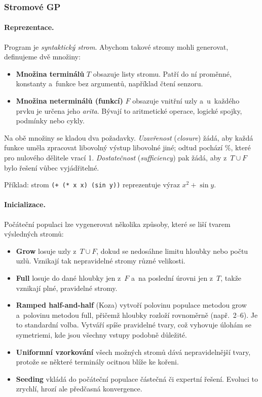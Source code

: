 \documentclass[11pt,a4paper]{article}
\theoremstyle{definition}
\begin{document}
\subsubsection{Stromové GP}

\paragraph{Reprezentace.} Program je \emph{syntaktický strom}. Abychom takové stromy
mohli generovat, definujeme dvě množiny:
\begin{itemize}
\item \textbf{Množina terminálů} $T$ obsazuje listy stromu. Patří do ní proměnné,
  konstanty a~funkce bez argumentů, například čtení senzoru.
\item \textbf{Množina neterminálů (funkcí)} $F$ obsazuje vnitřní uzly a~u~každého prvku
  je určena jeho \emph{arita}. Bývají to aritmetické operace, logické spojky, podmínky
  nebo cykly.
\end{itemize}
Na obě množiny se kladou dva požadavky. \emph{Uzavřenost} (\emph{closure}) žádá, aby
každá funkce uměla zpracovat libovolný výstup libovolné jiné; odtud pochází
 $\%$, které pro nulového dělitele vrací 1. \emph{Dostatečnost}
(\emph{sufficiency}) pak žádá, aby z~$T \cup F$ bylo řešení vůbec vyjádřitelné.

Příklad: strom \texttt{(+ (* x x) (sin y))} reprezentuje výraz $x^2 + \sin y$.

\paragraph{Inicializace.} Počáteční populaci lze vygenerovat několika způsoby, které se
liší tvarem výsledných stromů:
\begin{itemize}
\item \textbf{Grow} losuje uzly z~$T \cup F$, dokud se nedosáhne limitu hloubky nebo
  počtu uzlů. Vznikají tak nepravidelné stromy různé velikosti.
\item \textbf{Full} losuje do dané hloubky jen z~$F$ a~na poslední úrovni jen z~$T$,
  takže vznikají plné, pravidelné stromy.
\item \textbf{Ramped half-and-half} (Koza) vytvoří polovinu populace metodou grow
  a~polovinu metodou full, přičemž hloubky rozloží rovnoměrně (např.\ 2--6). Je to
  standardní volba. Vytváří spíše  pravidelné tvary, což vyhovuje úlohám se
  symetriemi, kde jsou všechny vstupy podobně důležité.
\item \textbf{Uniformní vzorkování} všech možných stromů dává nepravidelnější tvary,
  protože se některé terminály ocitnou blíže ke kořeni.
\item \textbf{Seeding} vkládá do počáteční populace částečná či expertní řešení. Evoluci
  to zrychlí, hrozí ale předčasná konvergence.
\end{itemize}
\end{document}
